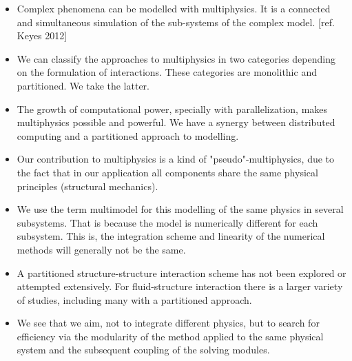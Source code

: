 \documentclass[a4paper, 11pt, oneside]{Thesis}  %
\begin{document}
    \begin{itemize}
        \item Complex phenomena can be modelled with multiphysics. It is a connected and simultaneous simulation of the sub-systems of the complex model. [ref. Keyes 2012]
        \item We can classify the approaches to multiphysics in two categories depending on the formulation of interactions. These categories are monolithic and partitioned. We take the latter.
        \item The growth of computational power, specially with parallelization, makes multiphysics possible and powerful. We have a synergy between distributed computing and a partitioned approach to modelling.
        \item Our contribution to multiphysics is a kind of "pseudo"-multiphysics, due to the fact that in our application all components share the same physical principles (structural mechanics).
        \item We use the term multimodel for this modelling of the same physics in several subsystems. That is because the model is numerically different for each subsystem. This is, the integration scheme and linearity of the numerical methods will generally not be the same.
        \item A partitioned structure-structure interaction scheme has not been explored or attempted extensively. For fluid-structure interaction there is a larger variety of studies, including many with a partitioned approach. 
        \item We see that we aim, not to integrate different physics, but to search for efficiency via the modularity of the method applied to the same physical system and the subsequent coupling of the solving modules.
        



\end{itemize}
\end{document}
